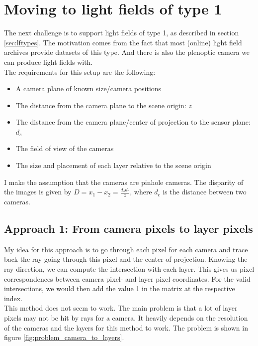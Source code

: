 \documentclass[11pt,a4paper,titlepage]{article}
\begin{document}
\section{Moving to light fields of type 1}
The next challenge is to support light fields of type 1, as described in section \ref{sec:lftypes}. The motivation comes from the fact that most (online) light field archives provide datasets of this type. And there is also the plenoptic camera we can produce light fields with. 
\\
The requirements for this setup are the following:

\begin{itemize}
	\item A camera plane of known size/camera positions
	\item The distance from the camera plane to the scene origin: $z$
	\item The distance from the camera plane/center of projection to the sensor plane: $d_s$
	\item The field of view of the cameras
	\item The size and placement of each layer relative to the scene origin
\end{itemize}

I make the assumption that the cameras are pinhole cameras. The disparity of the images is given by $D = x_1 - x_2 = \frac{d_s d_c}{z}$, where $d_c$ is the distance between two cameras.

\subsection{Approach 1: From camera pixels to layer pixels}
My idea for this approach is to go through each pixel for each camera and trace back the ray going through this pixel and the center of projection. Knowing the ray direction, we can compute the intersection with each layer. This gives us pixel correspondences between camera pixel- and layer pixel coordinates. For the valid intersections, we would then add the value 1 in the matrix at the respective index. 
\\
This method does not seem to work. The main problem is that a lot of layer pixels may not be hit by rays for a camera. It heavily depends on the resolution of the cameras and the layers for this method to work. The problem is shown in figure \ref{fig:problem_camera_to_layers}.
\end{document}
